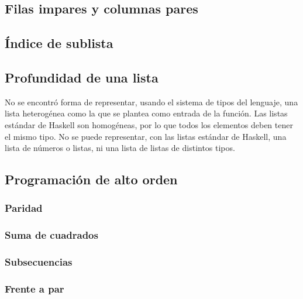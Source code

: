 \documentclass[12pt]{article}
\begin{document}
\subsection{Filas impares y columnas pares}



\subsection{Índice de sublista}



\subsection{Profundidad de una lista}

No se encontró forma de representar, usando el sistema de tipos del lenguaje,
una lista heterogénea como la que se plantea como entrada de la función. Las
listas estándar de Haskell son homogéneas, por lo que todos los elementos deben
tener el mismo tipo. No se puede representar, con las listas estándar de
Haskell, una lista de números o listas, ni una lista de listas de distintos
tipos.

\subsection{Programación de alto orden}

\subsubsection{Paridad}



\subsubsection{Suma de cuadrados}



\subsubsection{Subsecuencias}



\subsubsection{Frente a par}
\end{document}

